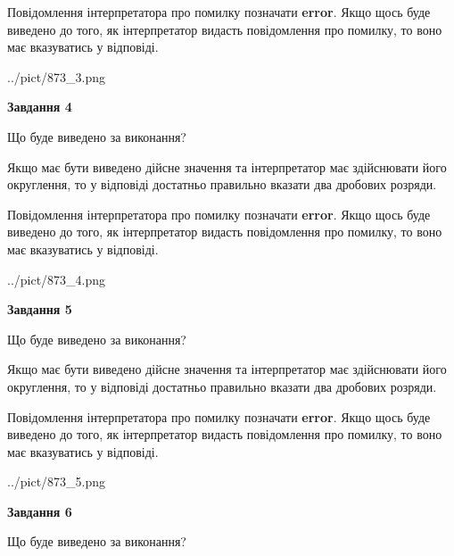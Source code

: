 \documentclass[12pt, ukrainian]{article}
\begin{document}
{\begin {Large}
Повідомлення інтерпретатора про помилку позначати \textbf{error}.
Якщо щось буде виведено до того, як інтерпретатор видасть повідомлення про помилку, 
то воно має вказуватись у відповіді. \par

\begin{center}
	{../pict/873_3.png}
\end{center}
\newpage

{\begin {center}\textbf{Завдання 4}\end {center}}\par
Що буде виведено за виконання? \par

Якщо має бути виведено дійсне значення та інтерпретатор має здійснювати його округлення, 
то у відповіді достатньо правильно вказати два дробових розряди.

Повідомлення інтерпретатора про помилку позначати \textbf{error}.
Якщо щось буде виведено до того, як інтерпретатор видасть повідомлення про помилку, 
то воно має вказуватись у відповіді. \par

\begin{center}
	{../pict/873_4.png}
\end{center}
\newpage

{\begin {center}\textbf{Завдання 5}\end {center}}\par
Що буде виведено за виконання? \par

Якщо має бути виведено дійсне значення та інтерпретатор має здійснювати його округлення, 
то у відповіді достатньо правильно вказати два дробових розряди.

Повідомлення інтерпретатора про помилку позначати \textbf{error}.
Якщо щось буде виведено до того, як інтерпретатор видасть повідомлення про помилку, 
то воно має вказуватись у відповіді. \par

\begin{center}
	{../pict/873_5.png}
\end{center}
\newpage

{\begin {center}\textbf{Завдання 6}\end {center}}\par
Що буде виведено за виконання? \par


\end{Large}}
\end{document}
